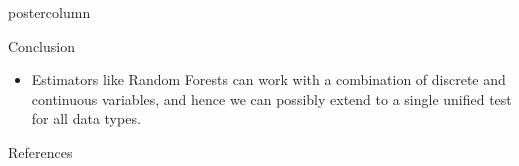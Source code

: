 \documentclass{beamer}
\begin{document}
\begin{frame}
\begin{columns}
\begin{column}{0.33\textwidth}
\begin{beamercolorbox}[center]{postercolumn}
\begin{minipage}{.98\textwidth}
{\begin{myblock}{Conclusion}
\begin{itemize}
				used with other tests.
			\item  Estimators like Random Forests can work with a
				combination of discrete and continuous
				variables, and hence we can possibly extend to
				a single unified test for all data types.
		\end{itemize}
	\end{myblock}\vfill
	\begin{myblock}{References}
		\footnotesize
		
		
	\end{myblock}\vfill
		}\end{minipage}\end{beamercolorbox}
	\end{column}
\end{columns}
\end{frame}
\end{document}
